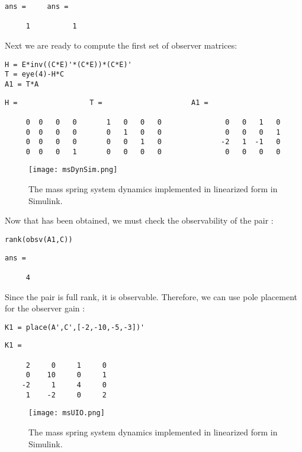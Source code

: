 \documentclass{amsart}
\theoremstyle{definition}
\theoremstyle{remark}
\numberwithin{equation}{section}
\begin{document}
        \color{lightgray} \begin{verbatim}
ans =     ans = 

     1          1
\end{verbatim} \color{black}
Next we are ready to compute the first set of observer matrices:
    \begin{verbatim}
H = E*inv((C*E)'*(C*E))*(C*E)'
T = eye(4)-H*C
A1 = T*A
\end{verbatim}

        \color{lightgray} \begin{verbatim}
H =                 T =                     A1 = 

     0  0   0   0       1   0   0   0               0   0   1   0
     0  0   0   0       0   1   0   0               0   0   0   1
     0  0   0   0       0   0   1   0              -2   1  -1   0
     0  0   0   1       0   0   0   0               0   0   0   0

\end{verbatim} \color{black}
\begin{figure}[H]
    \centering
    \texttt{[image: msDynSim.png]}
    \caption{The mass spring system dynamics implemented in linearized form in Simulink.}
    \label{fig:msDynSim}
\end{figure}

Now that  has been obtained, we must check the observability of the pair :
    \begin{verbatim}
rank(obsv(A1,C)) 
\end{verbatim}
        \color{lightgray} \begin{verbatim}
ans =

     4

\end{verbatim} \color{black}
Since the pair  is full rank, it is observable.  Therefore, we can use pole placement for the observer gain :
    \begin{verbatim}
K1 = place(A',C',[-2,-10,-5,-3])'
\end{verbatim}

        \color{lightgray} \begin{verbatim}
K1 =

     2     0     1     0
     0    10     0     1
    -2     1     4     0
     1    -2     0     2

\end{verbatim} \color{black}

\begin{figure}[H]
    \centering
    \texttt{[image: msUIO.png]}
    \caption{The mass spring system dynamics implemented in linearized form in Simulink.}
    \label{fig:msUIO}
\end{figure}
\end{document}
